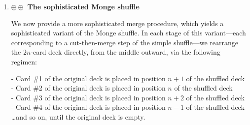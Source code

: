 \begin{enumerate}
\begin{enumerate}
  \item $\oplus \oplus$ {\bf The sophisticated Monge shuffle}

\smallskip

We now provide a more sophisticated merge procedure, which yields a sophisticated variant of the Monge shuffle.  In each stage of this variant---each corresponding to a cut-then-merge step of the simple shuffle---we rearrange the $2n$-card deck directly, from the middle outward, via the following regimen:

\smallskip

\noindent
- Card \#1 of the original deck is placed in position $n+1$ of the shuffled deck \\
- Card \#2 of the original deck is placed in position $n$ of the shuffled deck \\
- Card \#3 of the original deck is placed in position $n+2$ of the shuffled deck \\
- Card \#4 of the original deck is placed in position $n-1$ of the shuffled deck \\
\hspace*{.1in} \ldots and so on, until the original deck is empty.

\smallskip


\end{enumerate}
\end{enumerate}
